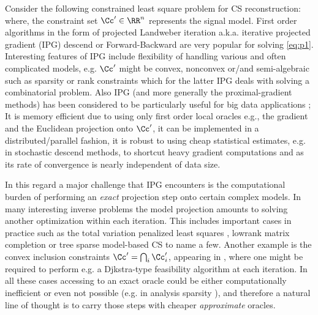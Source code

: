 Consider the following constrained least square problem for CS reconstruction:
where, the constraint set $\Cc'\in \RR^n$ represents the signal model. First order algorithms in the form of projected Landweber iteration a.k.a. iterative projected gradient (IPG) descend or Forward-Backward are very popular for solving \eqref{eq:p1}. 
Interesting features of IPG include flexibility of handling various and often complicated models, e.g. $\Cc'$ might be convex, nonconvex or/and semi-algebraic such as sparsity or rank constraints which for the latter IPG deals with solving a combinatorial problem.
Also IPG (and more generally the proximal-gradient methods) has been considered to be particularly useful for big data applications \cite{Volkan:bigdata}; It is memory efficient due to using only first order local oracles e.g., the gradient and the Euclidean projection onto $\Cc'$, it can be implemented in a distributed/parallel fashion, it is robust to using cheap statistical estimates, e.g. in stochastic descend methods\nref, to shortcut heavy gradient computations and as its rate of convergence is nearly independent of data size.


In this regard a major challenge that IPG encounters is the computational burden of performing an \emph{exact} projection step onto certain complex models. In many interesting inverse problems the model projection amounts to solving another optimization within each iteration. This includes important cases in practice such as the total variation penalized least squares \cite{Chambolle2011,TVprojGabirel}, lowrank matrix completion \cite{Ma2011} or tree sparse model-based CS \cite{modelbasedCS} to name a few. Another example is the convex inclusion constraints $\Cc'=\bigcap_i \Cc'_i$, appearing in \nref[spca][meLRJS], where one might be required to perform e.g. a Djkstra-type feasibility algorithm at each iteration.
In all these cases accessing to an exact oracle could be either computationally inefficient or even not possible (e.g. in analysis sparsity \nref), and therefore a natural line of thought is to carry those steps with cheaper \emph{approximate} oracles.

